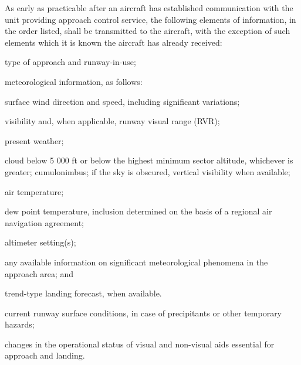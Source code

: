 
\begin{enumnoss}
    \item As early as practicable after an aircraft has established communication with the unit providing approach control service, the following elements of information, in the order listed, shall be transmitted to the aircraft, with the exception of such elements which it is known the aircraft has already received:

    \begin{enumalph}
        \item type of approach and runway-in-use;
        \item meteorological information, as follows:

        \begin{enumarab}
            \item surface wind direction and speed, including significant variations;
            \item visibility and, when applicable, runway visual range (RVR);
            \item present weather;
            \item cloud below 5 000 ft or below the highest minimum sector altitude, whichever is greater; cumulonimbus; if the sky is obscured, vertical visibility when available;
            \item air temperature;
            \item dew point temperature, inclusion determined on the basis of a regional air navigation agreement;
            \item altimeter setting(s);
            \item any available information on significant meteorological phenomena in the approach area; and
            \item trend-type landing forecast, when available.
        \end{enumarab}
    \end{enumalph}


    \begin{enumalph}[resume*]
        \item current runway surface conditions, in case of precipitants or other temporary hazards;
        \item changes in the operational status of visual and non-visual aids essential for approach and landing.
    \end{enumalph}


\end{enumnoss}
